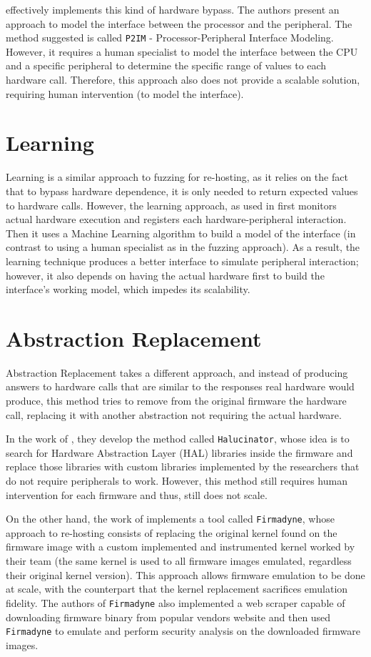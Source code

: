 \cite{p2im} effectively implements this kind of hardware bypass.  The authors present an approach to model the interface between the processor and the peripheral. The method suggested is called {\tt P2IM} - Processor-Peripheral Interface Modeling.  However, it requires a human specialist to model the interface between the CPU and a specific peripheral to determine the specific range of values to each hardware call. Therefore, this approach also does not provide a scalable solution, requiring human intervention (to model the interface).

\section{Learning}

Learning is a similar approach to fuzzing for re-hosting, as it relies on the fact that to bypass hardware dependence, it is only needed to return expected values to hardware calls. However, the learning approach, as used in \cite{pretender} first monitors actual hardware execution and registers each hardware-peripheral interaction. Then it uses a Machine Learning algorithm to build a model of the interface (in contrast to using a human specialist as in the fuzzing approach). As a result, the learning technique produces a better interface to simulate peripheral interaction; however, it also depends on having the actual hardware first to build the interface's working model, which impedes its scalability.

\section{Abstraction Replacement}

Abstraction Replacement takes a different approach, and instead of producing answers to hardware calls that are similar to the responses real hardware would produce, this method tries to remove from the original firmware the hardware call, replacing it with another abstraction not requiring the actual hardware.

In the work of \cite{halucinator}, they develop the method called {\tt Halucinator}, whose idea is to search for Hardware Abstraction Layer (HAL) libraries inside the firmware and replace those libraries with custom libraries implemented by the researchers that do not require peripherals to work. However, this method still requires human intervention for each firmware and thus, still does not scale.

On the other hand, the work of \cite{firmadyne} implements a tool called {\tt Firmadyne}, whose approach to re-hosting consists of replacing the original kernel found on the firmware image with a custom implemented and instrumented kernel worked by their team (the same kernel is used to all firmware images emulated, regardless their original kernel version). This approach allows firmware emulation to be done at scale, with the counterpart that the kernel replacement sacrifices emulation fidelity. The authors of {\tt Firmadyne} also implemented a web scraper capable of downloading firmware binary from popular vendors website and then used {\tt Firmadyne} to emulate and perform security analysis on the downloaded firmware images.

